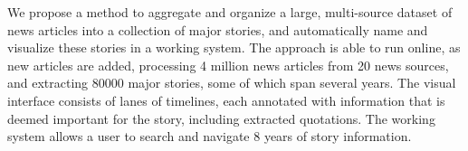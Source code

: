 We propose a method to aggregate and organize a large, multi-source dataset of news articles into a collection of major stories, and automatically name and visualize these stories in a working system. The approach is able to run online, as new articles are added, processing 4 million news articles from 20 news sources, and extracting 80000 major stories, some of which span several years. The visual interface consists of lanes of timelines, each annotated with information that is deemed important for the story, including extracted quotations. The working system allows a user to search and navigate 8 years of story information.
